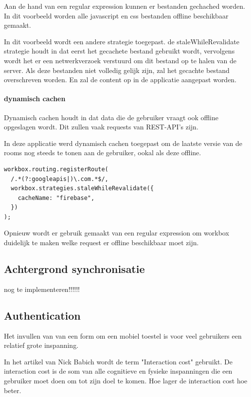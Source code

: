 			Aan de hand van een regular expression kunnen er bestanden gechached worden. In dit voorbeeld worden alle javascript en css bestanden offline beschikbaar gemaakt.
			
			In dit voorbeeld wordt een andere strategie toegepast. de staleWhileRevalidate strategie houdt in dat eerst het gecachete bestand gebruikt wordt, vervolgens wordt het er een netwerkverzoek verstuurd om dit bestand op te halen van de server. Als deze bestanden niet volledig gelijk zijn, zal het gecachte bestand overschreven worden. En zal de content op in de applicatie aangepast worden.
			\autocite{Workbox2020b}
			
			
					
		\paragraph{dynamisch cachen}
			Dynamisch cachen houdt in dat data die de gebruiker vraagt ook offline opgeslagen wordt. Dit zullen vaak requests van REST-API's zijn.
			
			In deze applicatie werd dynamisch cachen toegepast om de laatste versie van de rooms nog steeds te tonen aan de gebruiker, ookal als deze offline.
			
\begin{lstlisting}
workbox.routing.registerRoute(
  /.*(?:googleapis|)\.com.*$/,
  workbox.strategies.staleWhileRevalidate({
    cacheName: "firebase",
  })
);
\end{lstlisting}
		
		Opnieuw wordt er gebruik gemaakt van een regular expression om workbox duidelijk te maken welke request er offline beschikbaar moet zijn.


	\subsection{Achtergrond synchronisatie}
	
	nog te implementeren!!!!!!
	
	\subsection{Authentication}
		
		Het invullen van van een form om een mobiel toestel is voor veel gebruikers een relatief grote inspanning.
		
		In het artikel van Nick Babich wordt de term "Interaction cost" gebruikt. De interaction cost is de som van alle cognitieve en fysieke inspanningen die een gebruiker moet doen om tot zijn doel te komen. Hoe lager de interaction cost hoe beter.
		\autocite{Babich2018}
		
